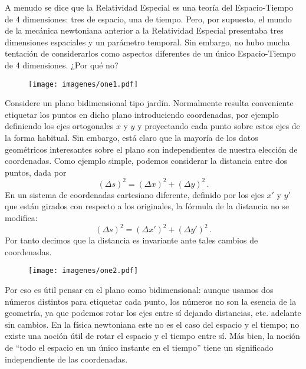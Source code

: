 \documentclass[11pt,b5paper,openany,twoside]{book}
\begin{document}
A menudo se dice que la Relatividad Especial es una teoría del Espacio-Tiempo de 4 dimensiones: tres de espacio, una de tiempo.
Pero, por supuesto, el mundo de la mecánica newtoniana anterior a la Relatividad Especial presentaba tres dimensiones espaciales y un parámetro temporal.
Sin embargo, no hubo mucha tentación de considerarlos como aspectos diferentes de un único Espacio-Tiempo de 4 dimensiones.
¿Por qué no?

\begin{figure}[h]
\centering
\texttt{[image: imagenes/one1.pdf]}
\end{figure}


Considere un plano bidimensional tipo jardín.
Normalmente resulta conveniente etiquetar los puntos en dicho plano introduciendo coordenadas, por ejemplo definiendo los ejes ortogonales $x$ y $y$ y proyectando cada punto sobre estos ejes de la forma habitual.
Sin embargo, está claro que la mayoría de los datos geométricos interesantes sobre el plano son independientes de nuestra elección de coordenadas.
Como ejemplo simple, podemos considerar la distancia entre dos puntos, dada por
\begin{equation}
(\Delta s)^2 = (\Delta x)^2 + (\Delta y)^2\,.\label{1.1}
\end{equation}
En un sistema de coordenadas cartesiano diferente, definido por los ejes $x'$ y $y'$ que están girados con respecto a los originales, la fórmula de la distancia no se modifica:
\begin{equation}
(\Delta s)^2 = (\Delta x')^2 + (\Delta y')^2\,.\label{1.2}
\end{equation}
Por tanto decimos que la distancia es invariante ante tales cambios de coordenadas.

\begin{figure}[h]
\centering
\texttt{[image: imagenes/one2.pdf]}
\end{figure}

Por eso es útil pensar en el plano como bidimensional: aunque usamos dos números distintos para etiquetar cada punto, los números no son la esencia de la geometría, ya que podemos rotar los ejes entre sí dejando distancias, etc. adelante sin cambios.
En la física newtoniana este no es el caso del espacio y el tiempo; no existe una noción útil de rotar el espacio y el tiempo entre sí.
Más bien, la noción de ``todo el espacio en un único instante en el tiempo'' tiene un significado independiente de las coordenadas.
\end{document}
